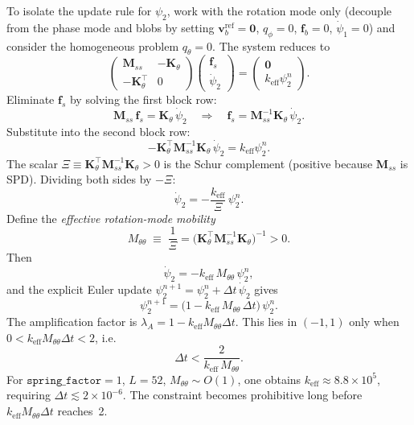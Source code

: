 \documentclass[11pt]{article}
\newcommand{\dt}{\Delta t}
\newcommand{\keff}{k_\mathrm{eff}}
\newcommand{\Mtt}{M_{\theta\theta}}
\newcommand{\Kth}{\mathbf{K}_\theta}
\newcommand{\Mss}{\mathbf{M}_{ss}}
\begin{document}
To isolate the update rule for $\psi_2$, work with the rotation mode
only (decouple from the phase mode and blobs by setting
$\mathbf{v}_b^\mathrm{ref}=\mathbf{0}$, $q_\phi=0$, $\mathbf{f}_b=0$,
$\dot\psi_1=0$) and consider the homogeneous problem $q_\theta=0$.
The system reduces to
\begin{equation}\label{eq:reduced_A}
\begin{pmatrix} \Mss & -\Kth \\ -\Kth^\top & 0 \end{pmatrix}
\begin{pmatrix} \mathbf{f}_s \\ \dot\psi_2 \end{pmatrix}
=
\begin{pmatrix} \mathbf{0} \\ \keff\psi_2^n \end{pmatrix}.
\end{equation}
Eliminate $\mathbf{f}_s$ by solving the first block row:
\begin{equation}\label{eq:fs_A}
  \Mss\,\mathbf{f}_s = \Kth\,\dot\psi_2
  \quad\Longrightarrow\quad
  \mathbf{f}_s = \Mss^{-1}\Kth\,\dot\psi_2.
\end{equation}
Substitute into the second block row:
\begin{equation}\label{eq:schur_A}
  -\Kth^\top \Mss^{-1}\Kth\,\dot\psi_2 = \keff\psi_2^n.
\end{equation}
The scalar $\Xi \equiv \Kth^\top\Mss^{-1}\Kth > 0$ is the Schur complement
(positive because $\Mss$ is SPD).  Dividing both sides by $-\Xi$:
\begin{equation}\label{eq:phidot_A}
  \dot\psi_2 = -\frac{\keff}{\Xi}\,\psi_2^n.
\end{equation}
Define the \emph{effective rotation-mode mobility}
\begin{equation}\label{eq:Mtt}
  \boxed{\Mtt \;\equiv\; \frac{1}{\Xi}
    = \bigl(\Kth^\top\Mss^{-1}\Kth\bigr)^{-1} > 0.}
\end{equation}
Then
\begin{equation}\label{eq:dotpsi_A}
  \dot\psi_2 = -\keff\,\Mtt\,\psi_2^n,
\end{equation}
and the explicit Euler update $\psi_2^{n+1}=\psi_2^n+\dt\,\dot\psi_2$ gives
\begin{equation}\label{eq:amp_A}
  \boxed{\psi_2^{n+1} = \bigl(1 - \keff\,\Mtt\,\dt\bigr)\,\psi_2^n.}
\end{equation}
The amplification factor is $\lambda_A = 1 - \keff\Mtt\dt$.
This lies in $(-1,1)$ only when $0 < \keff\Mtt\dt < 2$, i.e.\
\[
  \dt < \frac{2}{\keff\,\Mtt}.
\]
For $\mathtt{spring\_factor}=1$, $L=52$, $\Mtt\sim O(1)$, one obtains
$\keff\approx8.8\times10^5$, requiring $\dt\lesssim2\times10^{-6}$.
The constraint becomes prohibitive long before $\keff\Mtt\dt$ reaches~2.
\end{document}
